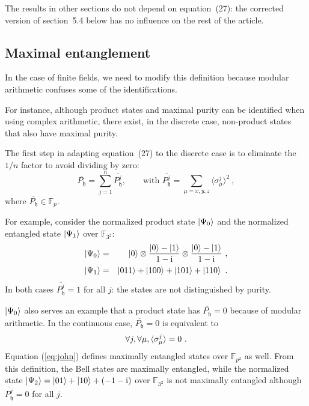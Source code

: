\documentclass{iopart}
\newcommand{\ComplexI}{\text{i}}
\newcommand{\ff}[1]{\mathbb{F}_{#1}}
\def\fh{\mathfrak{h}}
\begin{document}
\bigskip The results in other sections do not depend on equation~(27): the corrected version of section~5.4 below has no influence on the rest of the article. 

\subsection{Maximal entanglement}


In the case of finite fields, we need to modify this definition because modular arithmetic confuses some of the identifications. 



For instance, although product states and maximal purity can be identified when using complex arithmetic, there exist, in the discrete case, non-product states that also have maximal purity. 

The first step in adapting equation~(27) to the discrete case is to eliminate the $1/n$ factor to avoid dividing by zero: 
\begin{equation}
\overline{P_{\fh}}=\sum\limits _{j=1}^{n}\overline{P_{\fh}^{j}}, \qquad\mbox{with~}
\overline{P_{\fh}^j} = \sum\limits _{\mu=x,y,z}\langle\sigma_{\mu}^{j}\rangle^{2}\ ,
\end{equation}
where $\overline{P_{\fh}}\in\ff{p}$. 

For example, consider the normalized product state $\ket{\Psi_{0}}$ and the normalized entangled 
state $\ket{\Psi_{1}}$ over $\ff{3^{2}}$: 
\begin{eqnarray}
\ket{\Psi_{0}} & = & \ket{0}\otimes\frac{\ket{0}-\ket{1}}{1-\ComplexI}\otimes\frac{\ket{0}-\ket{1}}{1-\ComplexI}\ ,\\
\ket{\Psi_{1}} & = & \ket{011}+\ket{100}+\ket{101}+\ket{110}\ .
\end{eqnarray}
In both cases $\overline{P_{\fh}^j} = 1$ for all $j$: the states are not distinguished by purity. 

$\ket{\Psi_{0}}$ also serves an example that a product state has
$\overline{P_{\fh}}=0$ because of modular arithmetic. In the continuous
case, $\overline{P_{\fh}}=0$ is equivalent to 
\begin{equation}
\forall j,\forall\mu,\braket{\sigma_{\mu}^{j}}=0\label{eq:john}\ .
\end{equation}
Equation (\ref{eq:john}) defines maximally entangled states over $\ff{p^{2}}$
as well. From this definition, the Bell states are maximally entangled,
while the normalized state $\ket{\Psi_{2}} = \ket{01}+\ket{10}+\left(-1-\ComplexI\right)$ over $\ff{3^{2}}$ is not maximally entangled although $\overline{P_{\fh}^{j}}=0$ for all $j$.
\end{document}

